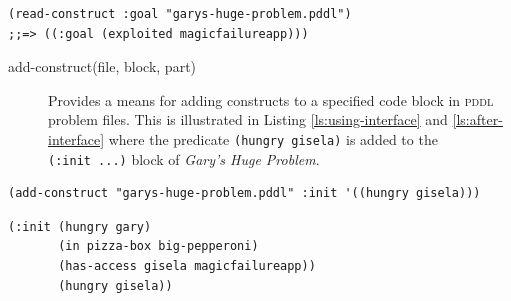 \documentclass[runningheads]{llncs}
\newcommand{\pddl}{\textsc{pddl}\xspace}
\begin{document}
\begin{description}
\begin{listing}[H]
\begin{verbatim}
(read-construct :goal "garys-huge-problem.pddl")
;;=> ((:goal (exploited magicfailureapp)))
\end{verbatim}
\caption[Extracting the goal state using the interface]{\label{src:read-construct}Extracting the goal state of \emph{Gary's Huge Problem} by using the interface.}
\end{listing}

\begin{description}
\item[{add-construct(file, block, part)}] Provides a means for adding
constructs to a specified code block in \pddl problem files. This
is illustrated in Listing \ref{ls:using-interface} and
\ref{ls:after-interface} where the predicate \texttt{(hungry gisela)} is
added to the \texttt{(:init~...)} block of \emph{Gary's Huge Problem}.
\end{description}

\begin{listing}[H]
\begin{verbatim}
(add-construct "garys-huge-problem.pddl" :init '((hungry gisela)))
\end{verbatim}
\caption[Adding a predicate using the
interface]{\label{ls:using-interface}Adding the predicate
  \texttt{(hungry~ gisela)} to the \texttt{(:init~...)} block of
  \emph{Gary's Huge Problem} using the PDDL/Clojure interface.}
\end{listing}

\begin{listing}[H]
  \begin{verbatim}
(:init (hungry gary)
       (in pizza-box big-pepperoni)
       (has-access gisela magicfailureapp))
       (hungry gisela))
\end{verbatim}
\caption[Modified problem file]{\label{ls:after-interface}The modified
  part of the problem file to which the predicate \texttt{(hungry gisela)} has
  been added.}
\end{listing}



\end{description}
\end{document}
